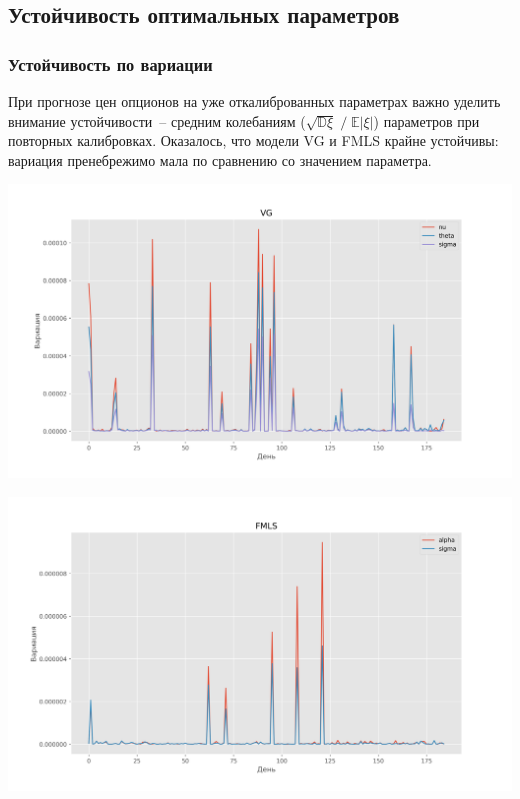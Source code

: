 \documentclass[oneside, final, 12pt, a4paper]{article}
\begin{document}
\subsection{Устойчивость оптимальных параметров}
\label{stability:label}
\subsubsection{Устойчивость по вариации}
При прогнозе цен опционов на уже откалиброванных параметрах важно уделить внимание устойчивости~-- средним колебаниям ($ \sqrt{\mathbb{D}\xi}\;/\;\mathbb{E}|\xi| $) параметров при повторных калибровках. Оказалось, что модели VG и FMLS крайне устойчивы: вариация пренебрежимо мала по сравнению со значением параметра.

\begin{center}
  \includegraphics[width=1\linewidth]{img/vg_stable.png}
\end{center}

\begin{center}
  \includegraphics[width=1\linewidth]{img/ls_stable.png}
\end{center}
\end{document}
